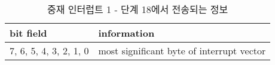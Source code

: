 %
%
\begin{table}[htbp]
\caption{중재 인터럽트 1 - 단계 18에서 전송되는 정보}\label{table:arb-int-p18}
   \begin{center}
   \begin{tabular}{|l|l|} \hline
	bit field & information \\
\hline \hline
	7, 6, 5, 4, 3, 2, 1, 0 & most significant byte of interrupt vector \\
\hline
   \end{tabular}
   \end{center}
\end{table}
%
%
